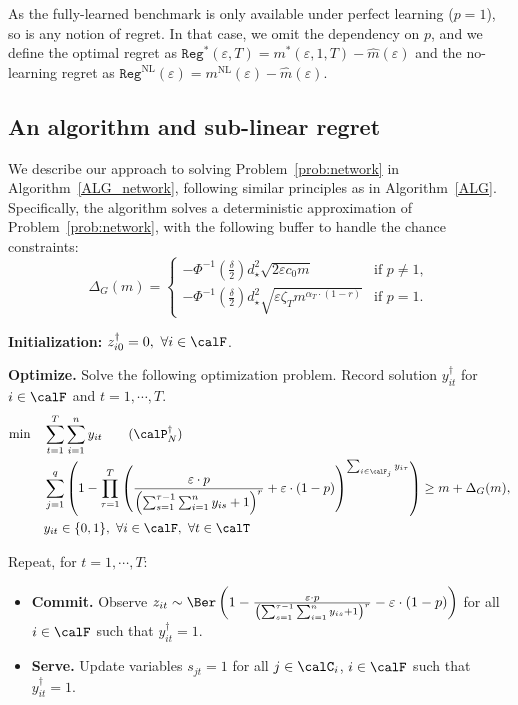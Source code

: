 \documentclass[blindrev]{informs3noheader}
\begin{document}
As the fully-learned benchmark is only available under perfect learning ($p=1$), so is any notion of regret. In that case, we omit the dependency on $p$, and we define the optimal regret as $\texttt{Reg}^*(\varepsilon,T)=m^*(\varepsilon,1,T)-\widehat{m}(\varepsilon)$ and the no-learning regret as $\texttt{Reg}^{\text{NL}}(\varepsilon)=m^{\text{NL}}(\varepsilon)-\widehat{m}(\varepsilon)$.

\subsection{An algorithm and sub-linear regret}
\label{subsec:network_ALG}

We describe our approach to solving Problem~\eqref{prob:network} in Algorithm~\ref{ALG_network}, following similar principles as in Algorithm~\ref{ALG}. Specifically, the algorithm solves a deterministic approximation of Problem~\eqref{prob:network}, with the following buffer to handle the chance constraints:
\begin{equation*}
\Delta_G(m) = \begin{cases}
    -\Phi^{-1}\left(\frac{\delta}{2}\right)d_\star^2\sqrt{2\varepsilon c_0 m}& \text{if }p\neq1,\\
        -\Phi^{-1}\left(\frac{\delta}{2}\right)d_\star^2\sqrt{\varepsilon \zeta_T m^{\alpha_T \cdot (1-r)}}& \text{if }p =1.
\end{cases}
\end{equation*}
\begin{algorithm} [h!]
\caption{Algorithm to solve Problem~\eqref{prob:network}.}\small
\label{ALG_network}
\begin{algorithmic}
\item \textbf{Initialization:} $z^\dagger_{i0}=0,\ \forall i\in\calF$.
\item \textbf{Optimize.} Solve the following optimization problem. Record solution $y^\dagger_{it}$ for $i\in\calF$ and $t=1,\cdots, T$.
\begin{align}
\min \quad & \sum_{t=1}^T \sum_{i=1}^n y_{it} \label{prob:network_ALG}\tag{$\calP_N^\dagger$}\\
\quad& \sum_{j=1}^q \left(1-\prod_{\tau=1}^T \left(\frac{\varepsilon\cdot p }{\left(\sum_{s=1}^{\tau-1} \sum_{i=1}^n y_{is} +1\right)^r}+\varepsilon\cdot(1-p)\right)^{\sum_{i \in \calF_j} y_{i\tau}}\right) \geq m+\Delta_G(m),\nonumber\\
\quad& y_{it}\in\{0,1\},\ \forall i\in \calF, \ \forall t\in\calT\nonumber
\end{align}
\item Repeat, for $t=1,\cdots,T$:
\begin{itemize}
\item[] \textbf{Commit.} Observe $z_{it}\sim \Ber\left(1-\frac{\varepsilon\cdot p}{\left(\sum_{s=1}^{\tau-1} \sum_{i=1}^n y_{is} +1\right)^r}-\varepsilon\cdot(1-p)\right)$ for all $i\in\calF$ such that $y^\dagger_{it}=1$.
\item[] \textbf{Serve.} Update variables $s_{jt}=1$ for all $j\in\calC_i$, $i\in\calF$ such that $y^\dagger_{it}=1$.
\end{itemize}
\end{algorithmic}
\end{algorithm}
\end{document}
